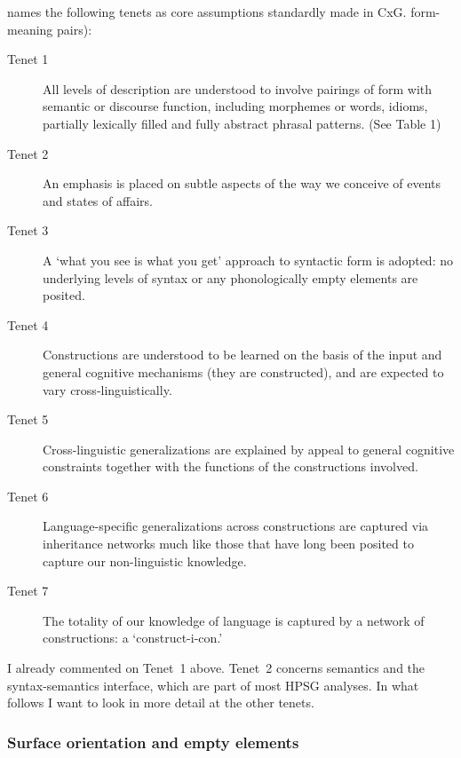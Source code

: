 \documentclass[output=paper]{langsci/langscibook}
\begin{document}
 \citet{Goldberg2003b} names the following tenets as core assumptions standardly made in CxG.
form-meaning pairs):
\begin{description}
\item[Tenet 1] All levels of description are understood to involve pairings of form with semantic or discourse function, including morphemes or words, idioms, partially lexically filled and fully abstract phrasal patterns. (See Table 1)
\item[Tenet 2] An emphasis is placed on subtle aspects of the way we conceive of events and states of
affairs.
\item[Tenet 3] A ‘what you see is what you get’ approach to syntactic form is adopted: no underlying levels
  of syntax or any phonologically empty elements are posited. 
\item[Tenet 4] Constructions are understood to be learned on the basis of the input and general cognitive mechanisms (they are constructed), and are expected to vary cross-linguistically.
\item[Tenet 5] Cross-linguistic generalizations are explained by appeal to general cognitive constraints together with the functions of the constructions involved.
\item[Tenet 6] Language-specific generalizations across constructions are captured via inheritance networks much like those that have long been posited to capture our non-linguistic knowledge.
\item[Tenet 7] The totality of our knowledge of language is captured by a network of constructions: a ‘construct-i-con.’
\end{description}

I already commented on Tenet~1 above. Tenet~2 concerns semantics and the syntax-semantics interface,
which are part of most HPSG analyses. In what follows I want to look in more detail at the other tenets. 

\subsubsection{Surface orientation and empty elements}
\end{document}
